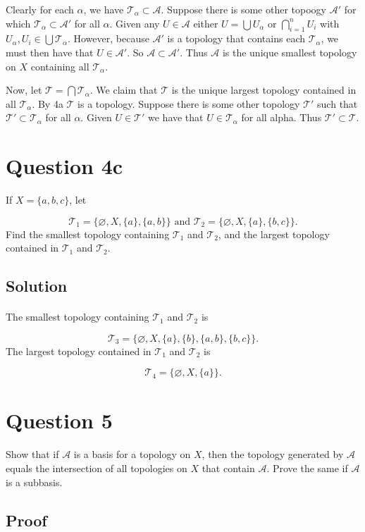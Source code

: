 \documentclass[11pt, oneside]{article}   	%
\begin{document}
Clearly for each $\alpha$, we have $\mathscr{T}_\alpha \subset \mathscr{A}$. Suppose there is some other topoogy $\mathscr{A}'$ for which $\mathscr{T}_\alpha \subset \mathscr{A}'$ for all $\alpha$. Given any $U \in \mathscr{A}$ either $U =  \bigcup U_{\alpha}$ or $\bigcap_{i=1}^n U_i$ with $U_\alpha, U_i \in \bigcup \mathscr{T}_\alpha$. However, because $\mathscr{A}'$ is a topology that contains each $\mathscr{T}_\alpha$, we must then have that $U \in \mathscr{A}'$. So $\mathscr{A} \subset \mathscr{A}'$. Thus $\mathscr{A}$ is the unique smallest topology on $X$ containing all $\mathscr{T}_\alpha$.

Now, let $\mathscr{T} = \bigcap \mathscr{T}_\alpha$. We claim that $\mathscr{T}$ is the unique largest topology contained in all $\mathscr{T}_\alpha$. By 4a $\mathscr{T}$ is a topology. Suppose there is some other topology $\mathscr{T}'$ such that $\mathscr{T}' \subset \mathscr{T}_\alpha$ for all $\alpha$. Given $U \in \mathscr{T}'$ we have that $U \in \mathscr{T}_\alpha$ for all alpha. Thus $\mathscr{T}' \subset \mathscr{T}$.


\section*{Question 4c}
If $X = \{a,b,c\}$, let

\[
\mathscr{T}_1 = \{\varnothing, X, \{a\}, \{a,b\}\} \text{ and } \mathscr{T}_2 = \{ \varnothing, X, \{a\}, \{b,c \}\}.
\]
Find the smallest topology containing $ \mathscr{T}_1$ and $\mathscr{T}_2$, and the largest topology contained in $ \mathscr{T}_1$ and $\mathscr{T}_2$.

\subsection*{Solution}
\paragraph{}

The smallest topology containing $ \mathscr{T}_1$ and $\mathscr{T}_2$ is 

\[
\mathscr{T}_3 = \{\varnothing, X, \{a\}, \{b\}, \{a,b\}, \{b,c\} \}.
\]
The largest topology contained in $ \mathscr{T}_1$ and $\mathscr{T}_2$ is

\[
\mathscr{T}_4 = \{\varnothing, X, \{a\} \}.
\]




\section*{Question 5}
\paragraph{}

Show that if $\mathscr{A}$ is a basis for a topology on $X$, then the topology generated by $\mathscr{A}$ equals the intersection of all topologies on $X$ that contain $\mathscr{A}$. Prove the same if $\mathscr{A}$ is a subbasis.

\subsection*{Proof}
\end{document}
